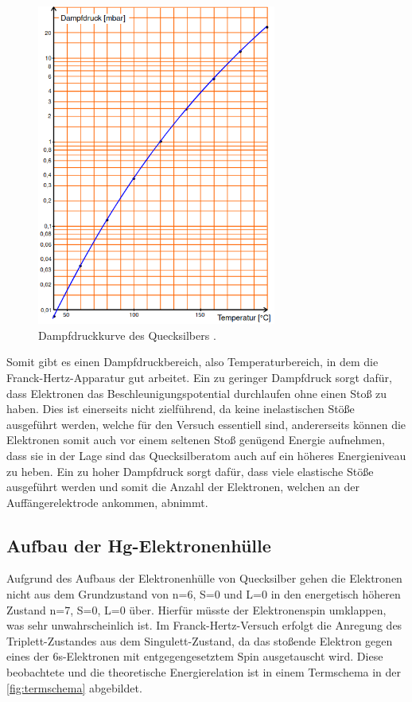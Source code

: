         \begin{figure}[H]
            \centering 
            \includegraphics[width=0.7\textwidth]{bilder/Dampfdruckkurve.png}
            \caption{Dampfdruckkurve des Quecksilbers \cite{anleitung}.}
            \label{fig:dampfdruckkurve}
        \end{figure}

        \noindent Somit gibt es einen Dampfdruckbereich, also Temperaturbereich, in dem die Franck-Hertz-Apparatur gut arbeitet. Ein zu geringer Dampfdruck sorgt
        dafür, dass Elektronen das Beschleunigungspotential durchlaufen ohne einen Stoß zu haben. Dies ist einerseits nicht zielführend, da keine inelastischen Stöße 
        ausgeführt werden, welche für den Versuch essentiell sind, andererseits können die Elektronen somit auch vor einem seltenen Stoß genügend Energie aufnehmen, 
        dass sie in der Lage sind das Quecksilberatom auch auf ein höheres Energieniveau zu heben. Ein zu hoher Dampfdruck sorgt dafür, dass viele elastische Stöße 
        ausgeführt werden und somit die Anzahl der Elektronen, welchen an der Auffängerelektrode ankommen, abnimmt. 


\subsection{Aufbau der Hg-Elektronenhülle}

    Aufgrund des Aufbaus der Elektronenhülle von Quecksilber gehen die Elektronen nicht aus dem Grundzustand von n=6, S=0 und L=0 in den energetisch höheren 
    Zustand n=7, S=0, L=0 über. Hierfür müsste der Elektronenspin umklappen, was sehr unwahrscheinlich ist. Im Franck-Hertz-Versuch erfolgt die Anregung des 
    Triplett-Zustandes aus dem Singulett-Zustand, da das stoßende Elektron gegen eines der 6s-Elektronen mit entgegengesetztem Spin ausgetauscht wird. 
    Diese beobachtete und die theoretische Energierelation ist in einem Termschema in der \autoref{fig:termschema} abgebildet. 
    
